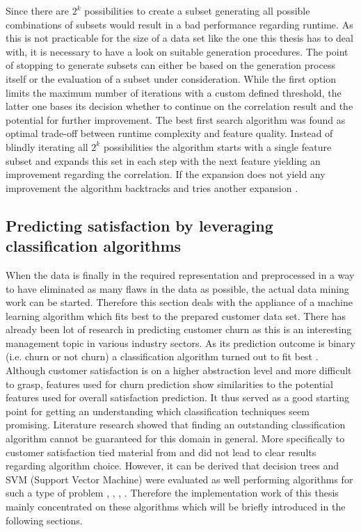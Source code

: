 Since there are $2^k$ possibilities to create a subset generating all possible combinations of subsets would result in a bad performance regarding runtime. As this is not practicable for the size of a data set like the one this thesis has to deal with, it is necessary to have a look on suitable generation procedures. The point of stopping to generate subsets can either be based on the generation process itself or the evaluation of a subset under consideration. While the first option limits the maximum number of iterations with a custom defined threshold, the latter one bases its decision whether to continue on the correlation result and the potential for further improvement. The best first search algorithm was found as optimal trade-off between runtime complexity and feature quality. Instead of blindly iterating all $2^k$ possibilities the algorithm starts with a single feature subset and expands this set in each step with the next feature yielding an improvement regarding the correlation. If the expansion does not yield any improvement the algorithm backtracks and tries another expansion \cite{hall2000correlation} \cite{dash1997feature}.

\subsection{Predicting satisfaction by leveraging classification algorithms}
\label{ssec:classificationAlgorithms}
When the data is finally in the required representation and preprocessed in a way to have eliminated as many flaws in the data as possible, the actual data mining work can be started. Therefore this section deals with the appliance of a machine learning algorithm which fits best to the prepared customer data set. There has already been lot of research in predicting customer churn as this is an interesting management topic in various industry sectors. As its prediction outcome is binary (i.e. churn or not churn) a classification algorithm turned out to fit best \cite{vafeiadis2015comparison} \cite{xie2009customer}. Although customer satisfaction is on a higher abstraction level and more difficult to grasp, features used for churn prediction show similarities to the potential features used for overall satisfaction prediction. It thus served as a good starting point for getting an understanding which classification techniques seem promising. Literature research showed that finding an outstanding classification algorithm cannot be guaranteed for this domain in general. More specifically to customer satisfaction tied material from \cite{mozer2000predicting} and \cite{meinzer2016can} did not lead to clear results regarding algorithm choice. However, it can be derived that decision trees and SVM (Support Vector Machine) were evaluated as well performing algorithms for such a type of problem \cite{vafeiadis2015comparison}, \cite{xie2009customer}, \cite{mozer2000predicting}, \cite{meinzer2016can}. Therefore the implementation work of this thesis mainly concentrated on these algorithms which will be briefly introduced in the following sections.

